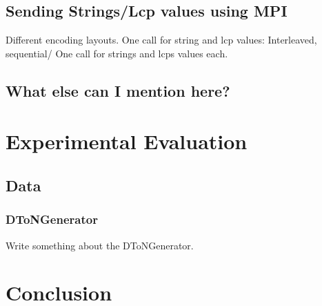 \documentclass[12pt,a4paper,twoside]{scrartcl}
\numberwithin{equation}{section}
\begin{document}
\subsection{Sending Strings/Lcp values using MPI}

Different encoding layouts. One call for string and lcp values: Interleaved, sequential/ One call for strings and lcps values each.

\subsection{What else can I mention here?}
	


\section{Experimental Evaluation}
\subsection{Data}
\subsubsection{DToNGenerator}
Write something about the DToNGenerator.


\section{Conclusion}







\clearpage




\end{document}
